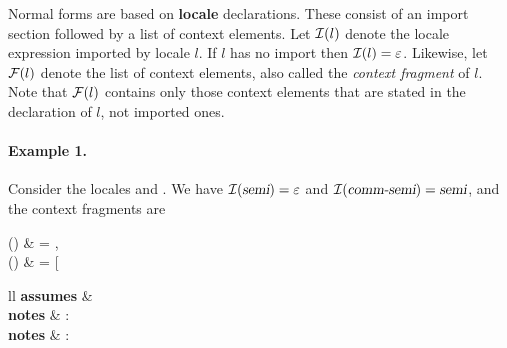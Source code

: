 \begin{isabellebody}
\begin{isamarkuptext}
  Normal forms are based on \textbf{locale} declarations.  These
  consist of an import section followed by a list of context
  elements.  Let $\mathcal{I}(l)$ denote the locale expression imported by
  locale $l$.  If $l$ has no import then $\mathcal{I}(l) = \varepsilon$.
  Likewise, let $\mathcal{F}(l)$ denote the list of context elements, also
  called the \emph{context fragment} of $l$.  Note that $\mathcal{F}(l)$
  contains only those context elements that are stated in the
  declaration of $l$, not imported ones.

\paragraph{Example 1.}  Consider the locales  and .  We have $\mathcal{I}(\emph{\sl semi}) = \varepsilon$ and
  $\mathcal{I}(\emph{\sl comm{\mbox{-}}semi}) = \emph{\sl semi}$, and the context fragments
  are
\begin{align*%
}
  \F() & = , \\
  \F() & = \left[
\begin{array}{ll}
  \textbf{assumes} &  \\
  \textbf{notes} & :  \\
  \textbf{notes} & : 

\end{array}
\end{align*%
}
\end{isamarkuptext}
\end{isabellebody}
